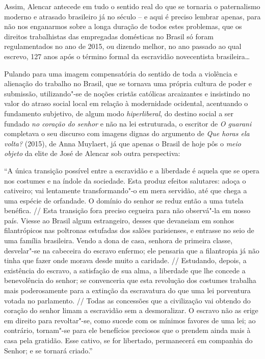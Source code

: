 Assim, Alencar antecede em tudo o sentido real do que se tornaria o
paternalismo moderno e atrasado brasileiro já no século  -- e aqui é
preciso lembrar apenas, para não nos enganarmos sobre a longa duração de
todos estes problemas, que os direitos trabalhistas das empregadas
domésticas no Brasil só foram regulamentados no ano de 2015, ou dizendo
melhor, no ano passado ao qual escrevo, 127 anos após o término formal
da escravidão novecentista brasileira\ldots{}

Pulando para uma imagem compensatória do sentido de toda a violência e
alienação do trabalho no Brasil, que se tornava uma própria cultura de
poder e submissão, utilizando"-se de noções cristãs católicas arcaizantes
e insistindo no valor do atraso social local em relação à modernidade
ocidental, acentuando o fundamento subjetivo, de algum modo
\emph{hiperliberal}, do destino social a ser fundado \emph{no coração do
senhor} e não na lei estruturada, o escritor de \emph{O guarani}
completava o seu discurso com imagens dignas do argumento de \emph{Que
horas ela volta?} (2015), de Anna Muylaert, já que apenas o Brasil de
hoje pôs o \emph{meio objeto} da elite de José de Alencar sob outra
perspectiva:

``A única transição possível entre a escravidão e a liberdade é aquela
que se opera nos costumes e na índole da sociedade. Esta produz efeitos
salutares: adoça o cativeiro; vai lentamente transformando"-o em mera
servidão, até que chega a uma espécie de orfandade. O domínio do senhor
se reduz então a uma tutela benéfica. // Esta transição fora preciso
cegueira para não observá"-la em nosso país. Viesse ao Brasil algum
estrangeiro, desses que devaneiam em sonhos filantrópicos nas poltronas
estufadas dos salões parisienses, e entrasse no seio de uma família
brasileira. Vendo a dona de casa, senhora de primeira classe,
desvelar"-se na cabeceira do escravo enfermo; ele pensaria que a
filantropia já não tinha que fazer onde morava desde muito a caridade.
// Estudando, depois, a existência do escravo, a satisfação de sua alma,
a liberdade que lhe concede a benevolência do senhor; se convenceria que
esta revolução dos costumes trabalha mais poderosamente para a extinção
da escravatura do que uma lei porventura votada no parlamento. // Todas
as concessões que a civilização vai obtendo do coração do senhor limam a
escravidão sem a desmoralizar. O escravo não as erige em direito para
revoltar"-se, como sucede com os mínimos favores de uma lei; ao
contrário, tornam"-se para ele benefícios preciosos que o prendem ainda
mais à casa pela gratidão. Esse cativo, se for libertado, permanecerá em
companhia do Senhor; e se tornará criado.''

